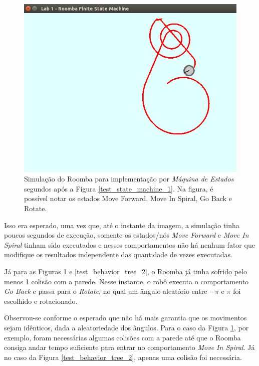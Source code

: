 \documentclass[conference]{IEEEtran}
\begin{document}
\begin{figure}[htbp]
\centerline{\includegraphics[scale=0.4]{test_state_machine_2.png}}
\caption{Simulação do Roomba para implementação por \textit{Máquina de Estados} segundos após a Figura \ref{test_state_machine_1}. Na figura, é possível notar os estados Move Forward, Move In Spiral, Go Back e Rotate.}
\label{test_state_mahine_2}
\end{figure} 

Isso era esperado, uma vez que, até o instante da imagem, a simulação tinha poucos segundos de execução, somente os estados/nós \textit{Move Forward} e \textit{Move In Spiral} tinham sido executados e nesses comportamentos não há nenhum fator que modifique os resultados independente das quantidade de vezes executadas.

Já para as Figuras \ref{test_state_mahine_2} e \ref{test_behavior_tree_2}, o Roomba já tinha sofrido pelo menos 1 colisão com a parede. Nesse instante, o robô executa o comportamento \textit{Go Back} e passa para o \textit{Rotate}, no qual um ângulo aleatório entre $-\pi$ e $\pi$ foi escolhido e rotacionado. 

Observou-se conforme o esperado que não há mais garantia que os movimentos sejam idênticos, dada a aleatoriedade dos ângulos. Para o caso da Figura \ref{test_state_mahine_2}, por exemplo, foram necessárias algumas colisões com a parede até que o Roomba consiga andar tempo suficiente para entrar no comportamento \textit{Move In Spiral}. Já no caso da Figura \ref{test_behavior_tree_2}, apenas uma colisão foi necessária. 
\end{document}
